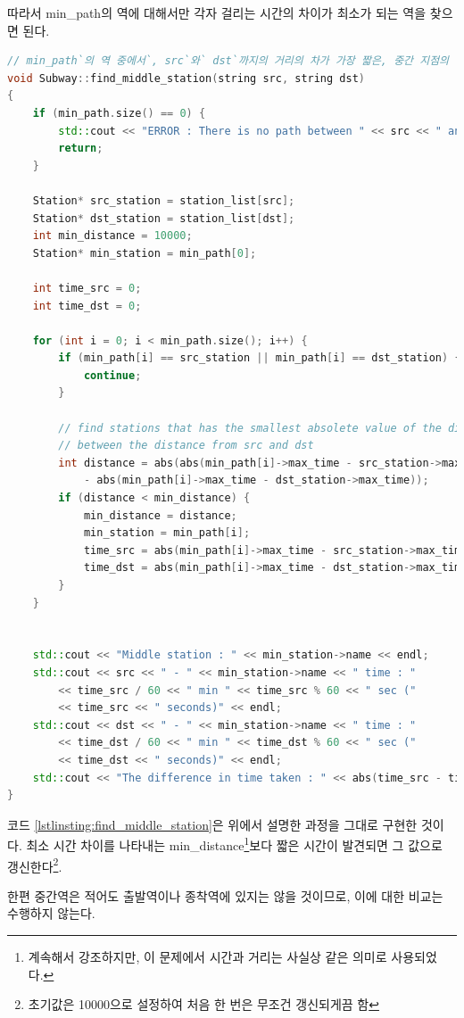 \documentclass{article}
\begin{document}
따라서 min\_path의 역에 대해서만 각자 걸리는 시간의 차이가 최소가 되는 역을 찾으면 된다.
\begin{lstlisting}[language=C++, escapeinside=``, caption={중간역 찾기}, label={lstlinsting:find_middle_station}]
// min_path`의 역 중에서`, src`와` dst`까지의 거리의 차가 가장 짧은, 중간 지점의 역을 찾아서 출력`
void Subway::find_middle_station(string src, string dst)
{
	if (min_path.size() == 0) {
		std::cout << "ERROR : There is no path between " << src << " and " << dst << endl;
		return;
	}
	
	Station* src_station = station_list[src];
	Station* dst_station = station_list[dst];
	int min_distance = 10000;
	Station* min_station = min_path[0];
	
	int time_src = 0;
	int time_dst = 0;
	
	for (int i = 0; i < min_path.size(); i++) {
		if (min_path[i] == src_station || min_path[i] == dst_station) {
			continue;
		}
		
		// find stations that has the smallest absolete value of the difference 
		// between the distance from src and dst
		int distance = abs(abs(min_path[i]->max_time - src_station->max_time) 
			- abs(min_path[i]->max_time - dst_station->max_time));
		if (distance < min_distance) {
			min_distance = distance;
			min_station = min_path[i];
			time_src = abs(min_path[i]->max_time - src_station->max_time);
			time_dst = abs(min_path[i]->max_time - dst_station->max_time);
		}
	}
	

	std::cout << "Middle station : " << min_station->name << endl;
	std::cout << src << " - " << min_station->name << " time : " 
		<< time_src / 60 << " min " << time_src % 60 << " sec (" 
		<< time_src << " seconds)" << endl;
	std::cout << dst << " - " << min_station->name << " time : " 
		<< time_dst / 60 << " min " << time_dst % 60 << " sec (" 
		<< time_dst << " seconds)" << endl;
	std::cout << "The difference in time taken : " << abs(time_src - time_dst) << " seconds" << endl;
}
\end{lstlisting}

코드 \ref{lstlinsting:find_middle_station}은 위에서 설명한 과정을 그대로 구현한 것이다. 최소 시간 차이를 나타내는 min\_distance\footnote{계속해서 강조하지만, 이 문제에서 시간과 거리는 사실상 같은 의미로 사용되었다.}보다 짧은 시간이 발견되면 그 값으로 갱신한다\footnote{초기값은 10000으로 설정하여 처음 한 번은 무조건 갱신되게끔 함}.

한편 중간역은 적어도 출발역이나 종착역에 있지는 않을 것이므로, 이에 대한 비교는 수행하지 않는다.
\end{document}
